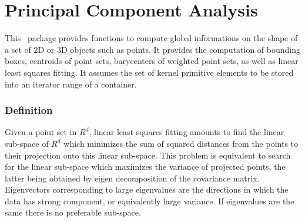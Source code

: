 
\chapter{Principal Component Analysis}
\label{ref_chapter_pca}


This \cgal\ package provides functions to compute global informations
on the shape of a set of 2D or 3D objects such as points. It provides the computation of bounding boxes, centroids of point sets, barycenters of weighted point sets, as well as linear least squares fitting. It assumes the set of kernel primitive elements to be stored into an iterator range of a container.


\subsection*{Definition}
Given a point set in $R^d$, linear least squares fitting amounts to
find the linear sub-space of $R^d$ which minimizes the sum of squared
distances from the points to their projection onto this linear
sub-space. This problem is equivalent to search for the linear
sub-space which maximizes the variance of projected points, the latter
being obtained by eigen decomposition of the covariance
matrix. Eigenvectors corresponding to large eigenvalues are the
directions in which the data has strong component, or equivalently
large variance. If eigenvalues are the same there is no preferable
sub-space.


\\
\\
\\
\\
\\
\clearpage

